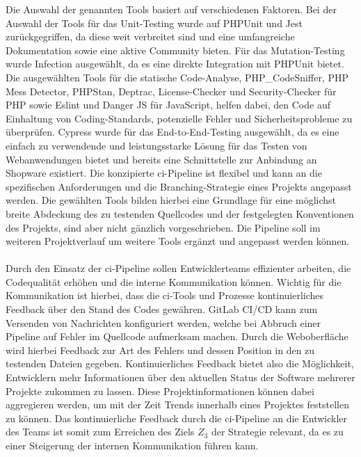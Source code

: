 Die Auswahl der genannten Tools basiert auf verschiedenen Faktoren.
Bei der Auswahl der Tools für das Unit-Testing wurde auf PHPUnit und Jest zurückgegriffen, da diese weit verbreitet sind
und eine umfangreiche Dokumentation sowie eine aktive Community bieten.
Für das Mutation-Testing wurde Infection ausgewählt, da es eine direkte Integration mit PHPUnit bietet.
Die ausgewählten Tools für die statische Code-Analyse, PHP\_CodeSniffer, PHP Mess Detector, PHPStan, Deptrac,
License-Checker und Security-Checker für PHP sowie Eslint und Danger JS für JavaScript, helfen dabei, den Code auf
Einhaltung von Coding-Standards, potenzielle Fehler und Sicherheitsprobleme zu überprüfen.
Cypress wurde für das End-to-End-Testing ausgewählt, da es eine einfach zu verwendende und leistungsstarke Lösung für
das Testen von Webanwendungen bietet und bereits eine Schnittstelle zur Anbindung an Shopware existiert.
Die konzipierte \acrshort{ci}-Pipeline ist flexibel und kann an die spezifischen Anforderungen und die
Branching-Strategie eines Projekts angepasst werden.
Die gewählten Tools bilden hierbei eine Grundlage für eine möglichst breite Abdeckung des zu testenden Quellcodes und
der festgelegten Konventionen des Projekts, sind aber nicht gänzlich vorgeschrieben.
Die Pipeline soll im weiteren Projektverlauf um weitere Tools ergänzt und angepasst werden können.
\\\\
Durch den Einsatz der \acrshort{ci}-Pipeline sollen Entwicklerteams effizienter arbeiten, die Codequalität erhöhen
und die interne Kommunikation können.
Wichtig für die Kommunikation ist hierbei, dass die \acrshort{ci}-Tools und Prozesse kontinuierliches Feedback über den
Stand des Codes gewähren.
GitLab CI/CD kann zum Versenden von Nachrichten konfiguriert werden, welche bei Abbruch einer Pipeline auf Fehler im
Quellcode aufmerksam machen.
Durch die Weboberfläche wird hierbei Feedback zur Art des Fehlers und dessen Position in den zu testenden Dateien
gegeben.
Kontinuierliches Feedback bietet also die Möglichkeit, Entwicklern mehr Informationen über den aktuellen Status der
Software mehrerer Projekte zukommen zu lassen.
Diese Projektinformationen können dabei aggregieren werden, um mit der Zeit Trends innerhalb eines Projektes feststellen
zu können.
Das kontinuierliche Feedback durch die \acrshort{ci}-Pipeline an die Entwickler des Teams ist somit zum Erreichen des
Ziels $Z_3$ der Strategie relevant, da es zu einer Steigerung der internen Kommunikation führen kann.

